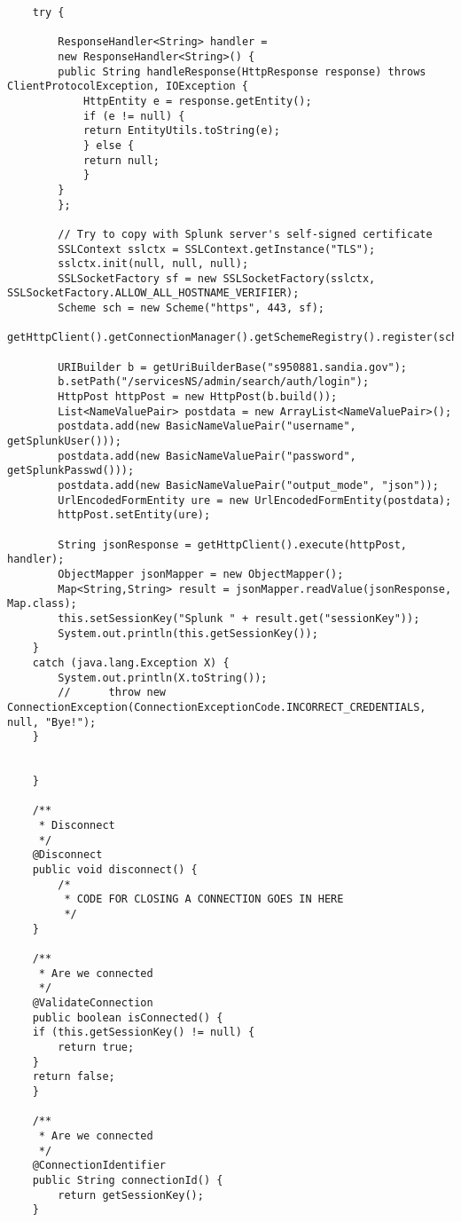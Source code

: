 \begin{lstlisting}
	try {
	    
	    ResponseHandler<String> handler = 
		new ResponseHandler<String>() {
		public String handleResponse(HttpResponse response) throws ClientProtocolException, IOException {
		    HttpEntity e = response.getEntity();
		    if (e != null) {
			return EntityUtils.toString(e);
		    } else {
			return null;
		    }
		}
	    };

	    // Try to copy with Splunk server's self-signed certificate
	    SSLContext sslctx = SSLContext.getInstance("TLS");
	    sslctx.init(null, null, null);
	    SSLSocketFactory sf = new SSLSocketFactory(sslctx, SSLSocketFactory.ALLOW_ALL_HOSTNAME_VERIFIER);
	    Scheme sch = new Scheme("https", 443, sf);
	    getHttpClient().getConnectionManager().getSchemeRegistry().register(sch);

	    URIBuilder b = getUriBuilderBase("s950881.sandia.gov");
	    b.setPath("/servicesNS/admin/search/auth/login");
	    HttpPost httpPost = new HttpPost(b.build());
	    List<NameValuePair> postdata = new ArrayList<NameValuePair>();
	    postdata.add(new BasicNameValuePair("username", getSplunkUser()));
	    postdata.add(new BasicNameValuePair("password", getSplunkPasswd()));
	    postdata.add(new BasicNameValuePair("output_mode", "json"));
	    UrlEncodedFormEntity ure = new UrlEncodedFormEntity(postdata);
	    httpPost.setEntity(ure);

	    String jsonResponse = getHttpClient().execute(httpPost, handler);
	    ObjectMapper jsonMapper = new ObjectMapper();
	    Map<String,String> result = jsonMapper.readValue(jsonResponse, Map.class);
	    this.setSessionKey("Splunk " + result.get("sessionKey"));
	    System.out.println(this.getSessionKey());
	}
	catch (java.lang.Exception X) {
	    System.out.println(X.toString());
	    //	    throw new ConnectionException(ConnectionExceptionCode.INCORRECT_CREDENTIALS, null, "Bye!");
	}
	   

    }

    /**
     * Disconnect
     */
    @Disconnect
    public void disconnect() {
        /*
         * CODE FOR CLOSING A CONNECTION GOES IN HERE
         */
    }

    /**
     * Are we connected
     */
    @ValidateConnection
    public boolean isConnected() {
	if (this.getSessionKey() != null) {
	    return true;
	}
	return false;
    }

    /**
     * Are we connected
     */
    @ConnectionIdentifier
    public String connectionId() {
        return getSessionKey();
    }


\end{lstlisting}
